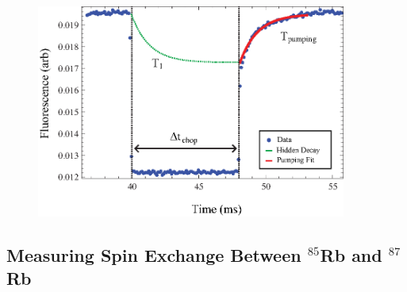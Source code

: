 \begin{figure}[htbp]
\begin{center}
\includegraphics[height=70mm]{./figures/raw_chop.eps}
\caption{\small{}}
\label{fig:chop}
\end{center}
\end{figure}

\subsection{Measuring Spin Exchange Between $^{85}$Rb and $^{87}$Rb}